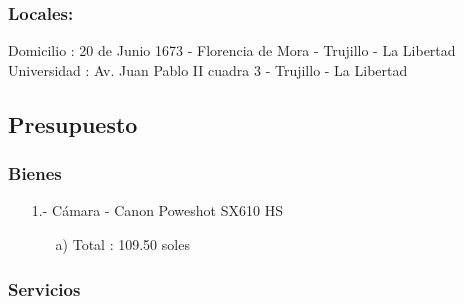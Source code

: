 \documentclass[a4paper, 12pt]{article}
\begin{document}
\subsubsection{{\bf Locales:}} 
Domicilio : 20 de Junio 1673 - Florencia de Mora - Trujillo - La Libertad \vskip 0.1cm
Universidad : Av. Juan Pablo II cuadra 3 - Trujillo - La Libertad

\subsection{Presupuesto}

\subsubsection{Bienes}

\begin{enumerate}
\item[1.-]Cámara - Canon Poweshot SX610 HS \vskip 0.3cm
\begin{enumerate}
\item[a)] Total : 109.50 soles
\vskip 0.3cm
\end{enumerate}
\end{enumerate}


\subsubsection{Servicios}
\end{document}
